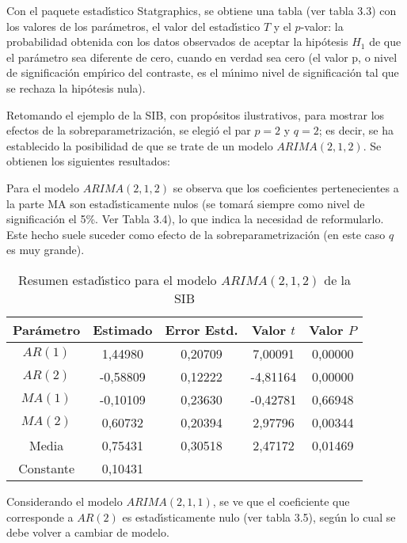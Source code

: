Con el paquete estad\'{\i}stico Statgraphics, se obtiene una tabla (ver 
tabla 3.3) con los valores de los par\'{a}metros, el valor del 
estad\'{\i}stico $T$ y el $p$-valor: la probabilidad obtenida con los datos 
observados de aceptar la hip\'{o}tesis $H_{1}$ de que el par\'{a}metro sea 
diferente de cero, cuando en verdad sea cero (el valor p, o nivel de 
significaci\'{o}n emp\'{\i}rico del contraste, es el m\'{\i}nimo nivel de 
significaci\'{o}n tal que se rechaza la hip\'{o}tesis nula).


\begin{ejemplo}
Retomando el ejemplo de la SIB, con prop\'{o}sitos ilustrativos, para mostrar los efectos de la sobreparametrizaci\'{o}n, se elegi\'{o} el par $p=2$ y $q=2$; es decir, se ha establecido la posibilidad de que se trate de un modelo $ARIMA(2,1,2)$. Se obtienen los siguientes resultados:

Para el modelo $ARIMA(2,1,2)$ se observa que los coeficientes pertenecientes 
a la parte MA son estad\'{\i}sticamente nulos (se tomar\'{a} siempre como 
nivel de significaci\'{o}n el 5{\%}. Ver Tabla 3.4), lo que indica la 
necesidad de reformularlo. Este hecho suele suceder como efecto de la 
sobreparametrizaci\'{o}n (en este caso $q $ es muy grande). 

\begin{table}[H]
\centering\small
\caption{Resumen estad\'{\i}stico para el modelo $ARIMA(2,1,2)$ de la SIB}
\begin{tabular}{@{}ccccc@{}}
\toprule
Par\'{a}metro& Estimado& Error Estd.& Valor $t$& Valor $P$ \\
\midrule
$AR(1)$& 1,44980& 0,20709& 7,00091& 0,00000 \\
$AR(2)$& -0,58809& 0,12222& -4,81164& 0,00000 \\
$MA(1)$& -0,10109& 0,23630& -0,42781& 0,66948 \\
$MA(2)$& 0,60732& 0,20394& 2,97796& 0,00344 \\
Media& 0,75431& 0,30518& 2,47172& 0,01469 \\
Constante& 0,10431& & &  \\
\bottomrule
\end{tabular}
\end{table}

Considerando el modelo $ARIMA(2,1,1)$, se ve que el coeficiente que 
corresponde a $AR(2)$ es estad\'{\i}sticamente nulo (ver tabla 3.5), 
seg\'{u}n lo cual se debe volver a cambiar de modelo.


\end{ejemplo}
